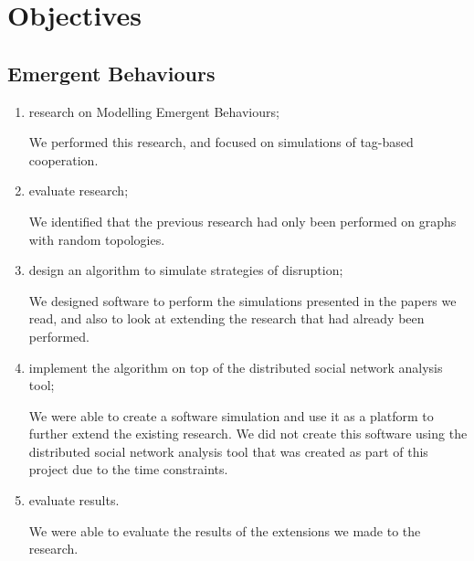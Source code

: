 \section{Objectives}

\subsection{Emergent Behaviours}

\begin{enumerate}
	\item research on Modelling Emergent Behaviours;
	
	We performed this research, and focused on simulations of tag-based cooperation.
	
	\item evaluate research;
	
	We identified that the previous research had only been performed on graphs with random topologies.
	
	\item design an algorithm to simulate strategies of disruption;
	
	We designed software to perform the simulations presented in the papers we read, and also to look at extending the research that had already been performed.
	
	\item implement the algorithm on top of the distributed social network analysis tool;
	
	We were able to create a software simulation and use it as a platform to further extend the existing research.
	We did not create this software using the distributed social network analysis tool that was created as part of this project due to the time constraints.
	
	\item evaluate results.
	
	We were able to evaluate the results of the extensions we made to the research.
\end{enumerate}